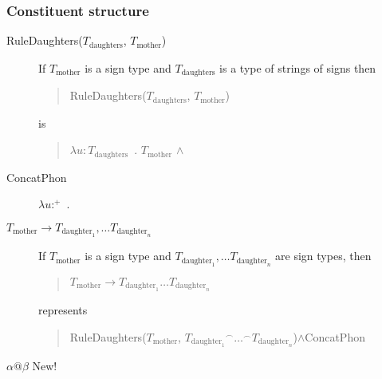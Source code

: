 \subsubsection{Constituent structure} 
\begin{description}
\item[\textnormal{RuleDaughters($T_{\text{daughters}}$,
$T_{\text{mother}}$)}] \mbox{}

If $T_{\text{mother}}$ is a sign type and $T_{\text{daughters}}$ is a
type of strings of signs then
\begin{quote}
RuleDaughters($T_{\text{daughters}}$,
$T_{\text{mother}}$)
\end{quote}
is
\begin{quote}
  $\lambda u\! :\! T_{\text{daughters}}$\ . $T_{\text{mother}}$ \d{$\wedge$} 
\end{quote}

\item[\textnormal{ConcatPhon}] \mbox{}

  $\lambda
u$:$^+$\
. \\
\hspace*{1em}

\item[\textnormal{$T_{\text{mother}}\longrightarrow T_{\text{daughter}_1},\ldots
    T_{\text{daughter}_n}$}] \mbox{}

  If $T_{\text{mother}}$ is a sign type and
  $T_{\text{daughter}_1},\ldots T_{\text{daughter}_n}$ are sign types,
  then
  \begin{quote}
    $T_{\text{mother}}\longrightarrow T_{\text{daughter}_1}\ldots
    T_{\text{daughter}_n}$
  \end{quote}
  represents
  \begin{quote}
RuleDaughters($T_{\text{mother}}$,
${T_{\text{daughter}_1}}^\frown\ldots^\frown T_{\text{daughter}_n}$)\d{\d{$\wedge$}}ConcatPhon 
\end{quote}

\item[\textnormal{$\alpha\text{@}\beta$} New!] \mbox{}


\end{description}
